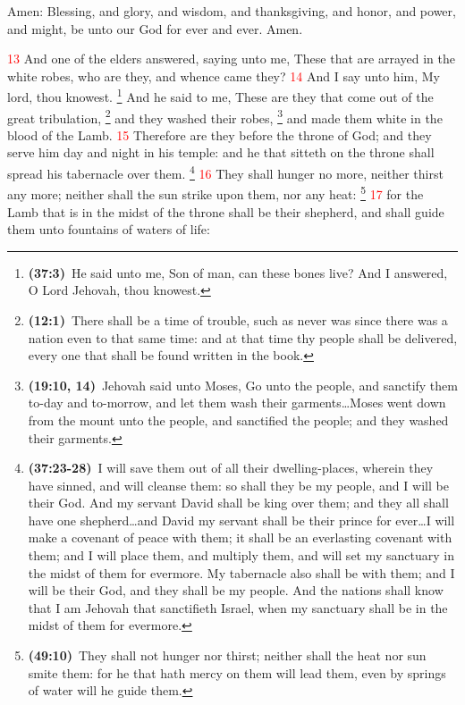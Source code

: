 \documentclass[12pt,twoside]{memoir}
\newcommand{\cbibleref}[3]{\textbf{\ibibleverse{#1}(#2)}\ {#3}}
\newcommand{\cbiblefoot}[3]{\footnote{\cbibleref{#1}{#2}{#3}}}
\newcommand{\cbiblefootduo}[6]{\footnote{\cbibleref{#1}{#2}{#3}\ldots \cbibleref{#4}{#5}{#6}}}
\newcommand{\vnum}[1]{\textcolor{red}{\normalsize{#1}}}
\begin{document}
Amen: Blessing, and glory, and wisdom, and thanksgiving, and honor, and power, and might, be unto our God for ever and ever. Amen.

\vnum{13} And one of the elders answered, saying unto me, These that are arrayed in the white robes, who are they, and whence came they? %
\vnum{14} And I say unto him, My lord, thou knowest.%
	\cbiblefoot{Ezekiel}{37:3}{He said unto me, Son of man, can these bones live? And I answered, O Lord Jehovah, thou knowest.}
 And he said to me, These are they that come out of the great tribulation,%
 	\cbiblefoot{Daniel}{12:1}{There shall be a time of trouble, such as never was since there was a nation even to that same time: and at that time thy people shall be delivered, every one that shall be found written in the book.}
  and they washed their robes,%
 	\cbiblefoot{Exodus}{19:10, 14}{Jehovah said unto Moses, Go unto the people, and sanctify them to-day and to-morrow, and let them wash their garments\ldots Moses went down from the mount unto the people, and sanctified the people; and they washed their garments.}
  and made them white in the blood of the Lamb. %
\vnum{15} Therefore are they before the throne of God; and they serve him day and night in his temple: and he that sitteth on the throne shall spread his tabernacle over them.%
	\footnote{
		\cbibleref{Ezekiel}{37:23-28}{I will save them out of all their dwelling-places, wherein they have sinned, and will cleanse them: so shall they be my people, and I will be their God. And my servant David shall be king over them; and they all shall have one shepherd\ldots and David my servant shall be their prince for ever\ldots I will make a covenant of peace with them; it shall be an everlasting covenant with them; and I will place them, and multiply them, and will set my sanctuary in the midst of them for evermore. My tabernacle also shall be with them; and I will be their God, and they shall be my people. And the nations shall know that I am Jehovah that sanctifieth Israel, when my sanctuary shall be in the midst of them for evermore.}
	} %
\vnum{16} They shall hunger no more, neither thirst any more; neither shall the sun strike upon them, nor any heat:%
	\cbiblefoot{Isaiah}{49:10}{They shall not hunger nor thirst; neither shall the heat nor sun smite them: for he that hath mercy on them will lead them, even by springs of water will he guide them.} %
\vnum{17} for the Lamb that is in the midst of the throne shall be their shepherd, and shall guide them unto fountains of waters of life:%
\end{document}
